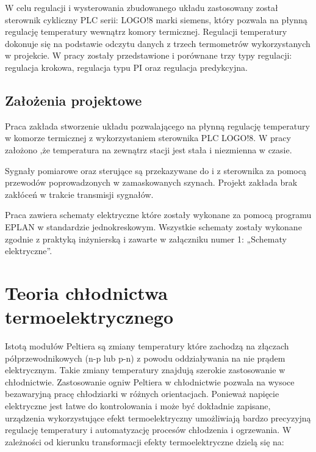 \documentclass[oneside]{mgr}
\begin{document}
W celu regulacji i wysterowania zbudowanego układu zastosowany został sterownik cykliczny PLC serii: LOGO!8 marki siemens, który pozwala na płynną regulację temperatury wewnątrz komory termicznej. Regulacji temperatury dokonuje się na podstawie odczytu danych z trzech termometrów wykorzystanych w projekcie. W pracy zostały przedstawione i porównane trzy typy regulacji: regulacja krokowa, regulacja typu PI oraz regulacja predykcyjna.

\section{Założenia projektowe}
Praca zakłada stworzenie układu pozwalającego na płynną regulację temperatury w komorze termicznej z wykorzystaniem sterownika PLC LOGO!8. W pracy założono ,że temperatura na zewnątrz stacji jest stała i niezmienna w czasie.

Sygnały pomiarowe oraz sterujące są przekazywane do i z sterownika za pomocą przewodów poprowadzonych w zamaskowanych szynach. Projekt zakłada brak zakłóceń w trakcie transmisji sygnałów.

Praca zawiera schematy elektryczne które zostały wykonane za pomocą programu EPLAN w standardzie jednokreskowym. Wszystkie schematy zostały wykonane zgodnie z praktyką inżynierską i zawarte w załączniku numer 1: „Schematy elektryczne”.

\chapter{Teoria chłodnictwa termoelektrycznego}
Istotą modułów Peltiera są zmiany temperatury które zachodzą na złączach półprzewodnikowych (n-p lub p-n) z powodu oddziaływania na nie prądem elektrycznym. Takie zmiany temperatury znajdują szerokie zastosowanie w chłodnictwie. Zastosowanie ogniw Peltiera w chłodnictwie pozwala na wysoce bezawaryjną pracę chłodziarki w różnych orientacjach. 
Ponieważ napięcie elektryczne jest łatwe do kontrolowania i może być dokładnie zapisane, urządzenia wykorzystujące efekt termoelektryczny umożliwiają bardzo precyzyjną regulację temperatury i automatyzację procesów chłodzenia i ogrzewania. W zależności od kierunku transformacji efekty termoelektryczne dzielą się na:
\end{document}
